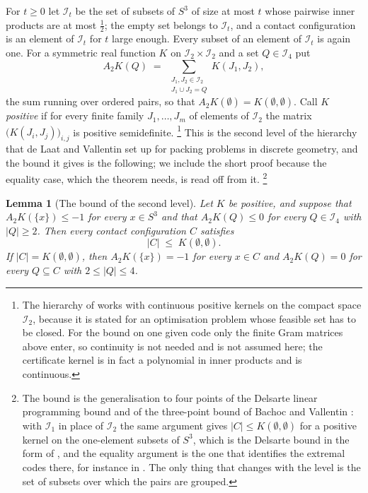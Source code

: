\documentclass[11pt,reqno]{amsart}
\renewcommand{\_}{\origunderscore\allowbreak}
\numberwithin{equation}{section}
\theoremstyle{plain}
\newtheorem{lem}[thm]{Lemma}
\theoremstyle{definition}
\theoremstyle{remark}
\begin{document}
For $t\ge0$ let $\mathcal I_t$ be the set of subsets of $S^3$ of size at
most $t$ whose pairwise inner products are at most $\tfrac12$; the empty
set belongs to $\mathcal I_t$, and a contact configuration is an element
of $\mathcal I_t$ for $t$ large enough. Every subset of an element of
$\mathcal I_t$ is again one. For a symmetric real function $K$ on
$\mathcal I_2\times\mathcal I_2$ and a set $Q\in\mathcal I_4$ put
\begin{equation}\label{eq:A2}
  A_2K(Q)\;=\;\sum_{\substack{J_1,J_2\in\mathcal I_2\\ J_1\cup J_2=Q}}K(J_1,J_2),
\end{equation}
the sum running over ordered pairs, so that $A_2K(\emptyset)=K(\emptyset,\emptyset)$.
Call $K$ \emph{positive} if for every finite family $J_1,\dots,J_m$ of
elements of $\mathcal I_2$ the matrix $\bigl(K(J_i,J_j)\bigr)_{i,j}$ is
positive semidefinite.%
\footnote{The hierarchy of \cite{dLV15} works with continuous positive
  kernels on the compact space $\mathcal I_2$, because it is stated for
  an optimisation problem whose feasible set has to be closed. For the
  bound on one given code only the finite Gram matrices above enter, so
  continuity is not needed and is not assumed here; the certificate
  kernel is in fact a polynomial in inner products and is continuous.}
This is the second level of the hierarchy that de
Laat and Vallentin \cite{dLV15} set up for packing problems in discrete
geometry, and the bound it gives is the following; we include the short
proof because the equality case, which the theorem needs, is read off
from it.%
\footnote{The bound is the generalisation to four points of the
  Delsarte linear programming bound and of the three-point bound of
  Bachoc and Vallentin \cite{BV08}: with $\mathcal I_1$ in place of
  $\mathcal I_2$ the same argument gives $|C|\le K(\emptyset,\emptyset)$
  for a positive kernel on the one-element subsets of $S^3$, which is
  the Delsarte bound in the form of \cite{DGS77}, and the equality
  argument is the one that identifies the extremal codes there, for
  instance in \cite{CK07}. The only thing that changes with the level
  is the set of subsets over which the pairs are grouped.}

\begin{lem}[The bound of the second level]\label{lem:las2}
Let $K$ be positive, and suppose that $A_2K(\{x\})\le-1$ for every
$x\in S^3$ and that $A_2K(Q)\le0$ for every $Q\in\mathcal I_4$ with
$|Q|\ge2$. Then every contact configuration $C$ satisfies
\[
  |C|\;\le\;K(\emptyset,\emptyset).
\]
If $|C|=K(\emptyset,\emptyset)$, then $A_2K(\{x\})=-1$ for every $x\in C$
and $A_2K(Q)=0$ for every $Q\subseteq C$ with $2\le|Q|\le4$.
\end{lem}
\end{document}
